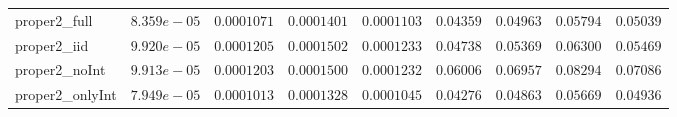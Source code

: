 \begin{table}
\begin{tabular}{lcccccccc}
proper2_full  & $8.359e-05$ & $0.0001071$ & $0.0001401$ & $0.0001103$ & $0.04359$ & $0.04963$ & $0.05794$ & $0.05039$ \\
proper2_iid  & $9.920e-05$ & $0.0001205$ & $0.0001502$ & $0.0001233$ & $0.04738$ & $0.05369$ & $0.06300$ & $0.05469$ \\
proper2_noInt  & $9.913e-05$ & $0.0001203$ & $0.0001500$ & $0.0001232$ & $0.06006$ & $0.06957$ & $0.08294$ & $0.07086$ \\
proper2_onlyInt  & $7.949e-05$ & $0.0001013$ & $0.0001328$ & $0.0001045$ & $0.04276$ & $0.04863$ & $0.05669$ & $0.04936$ \\
\hline 
\end{tabular}


\end{table}